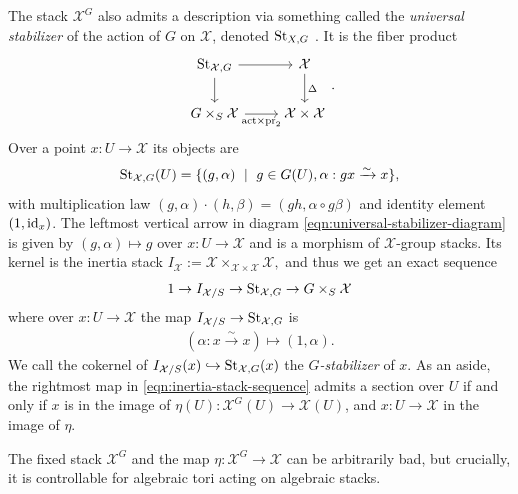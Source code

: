 The stack \(\mathcal X^G\) also admits a description via something called the \emph{universal stabilizer} of the action of $G$ on $\mathcal X$, denoted \(\operatorname{St}_{X,G}\) \cite[Section 4.1]{romagny_AlgebraicitySmoothnessFixed2022}. It is the fiber product
\begin{equation}\label{eqn:universal-stabilizer-diagram}
\begin{tikzcd}
  \St_{\mathcal X,G} \arrow[d]\arrow[r]& \mathcal X \arrow[d,"\Delta"] \\
  G\times_S \mathcal X\arrow[r,swap,"\text{act}\times \pr_2"]&\mathcal X\times \mathcal X
\end{tikzcd}.
\end{equation}
Over a point \(x:U\to \mathcal X\) its objects are
\begin{align*}
  \operatorname{St}_{\mathcal X,G}(U) = \{(g,\alpha) ~\mid~ g\in G(U), \alpha:gx\xrightarrow{\sim} x\},
\end{align*}
with multiplication law \((g,\alpha) \cdot (h,\beta) = (gh, \alpha \circ g\beta)\) and identity element \((1,\operatorname{id}_x)\). The leftmost vertical arrow in diagram \eqref{eqn:universal-stabilizer-diagram} is given by \((g,\alpha) \mapsto g\) over \(x:U\to \mathcal X\) and is a morphism of \(\mathcal X\)-group stacks. Its kernel is the inertia stack \(I_{\mathcal X} := \mathcal X\times_{\mathcal X\times \mathcal X}\mathcal X,\) and thus we get an exact sequence
\begin{equation}
  \label{eqn:inertia-stack-sequence}
  1 \to I_{\mathcal X/S} \to \operatorname{St}_{\mathcal X,G} \to G\times_S \mathcal X
\end{equation}
where over \(x:U\to \mathcal X\) the map \(I_{\mathcal X/S}\to \operatorname{St}_{\mathcal X, G}\) is
\begin{align*}
  (\alpha:x\xrightarrow{\sim} x) \mapsto (1, \alpha).
\end{align*}
We call the cokernel of \(I_{\mathcal X/S}(x)\hookrightarrow \operatorname{St}_{\mathcal X, G}(x)\) the \emph{\(G\)-stabilizer} of \(x\). As an aside, the rightmost map in \eqref{eqn:inertia-stack-sequence} admits a section over \(U\) if and only if \(x\) is in the image of \(\eta(U):\mathcal X^G(U)\to \mathcal X(U)\), and \(x:U\to \mathcal X\) in the image of \(\eta\).




The fixed stack \(\mathcal X^G\) and the map \(\eta:\mathcal X^G\to \mathcal X\) can be arbitrarily bad, but crucially, it is controllable for algebraic tori acting on algebraic stacks.
